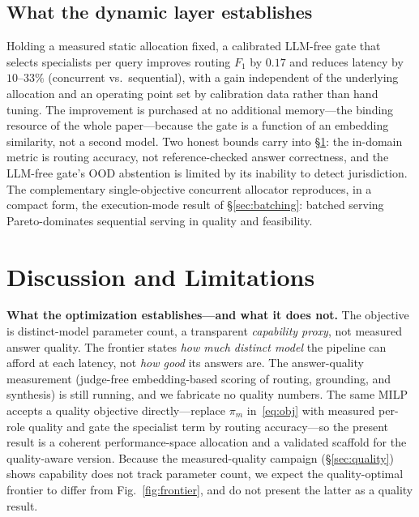 \documentclass[11pt]{article}
\begin{document}
\subsection{What the dynamic layer establishes}
Holding a measured static allocation fixed, a calibrated LLM-free gate that selects
specialists per query improves routing $F_1$ by $0.17$ and reduces latency by
$10$--$33\%$ (concurrent vs.\ sequential), with a gain independent of the underlying
allocation and an operating point set by calibration data rather than hand tuning.
The improvement is purchased at no additional memory---the binding resource of the
whole paper---because the gate is a function of an embedding similarity, not a second
model. Two honest bounds carry into §\ref{sec:limits}: the in-domain metric is
routing accuracy, not reference-checked answer correctness, and the LLM-free gate's
OOD abstention is limited by its inability to detect jurisdiction. The complementary
single-objective concurrent allocator reproduces, in a compact form, the
execution-mode result of §\ref{sec:batching}: batched serving Pareto-dominates
sequential serving in quality and feasibility.


\section{Discussion and Limitations}
\label{sec:limits}
\textbf{What the optimization establishes---and what it does not.} The objective
is distinct-model parameter count, a transparent \emph{capability proxy}, not
measured answer quality. The frontier states \emph{how much distinct model} the
pipeline can afford at each latency, not \emph{how good} its answers are. The
answer-quality measurement (judge-free embedding-based scoring of routing,
grounding, and synthesis) is still running, and we fabricate no quality numbers.
The same MILP accepts a quality objective directly---replace $\pi_m$
in~\eqref{eq:obj} with measured per-role quality and gate the specialist term by
routing accuracy---so the present result is a coherent performance-space
allocation and a validated scaffold for the quality-aware version. Because the
measured-quality campaign (§\ref{sec:quality}) shows capability does not track
parameter count, we expect the quality-optimal frontier to differ from
Fig.~\ref{fig:frontier}, and do not present the latter as a quality result.
\end{document}
